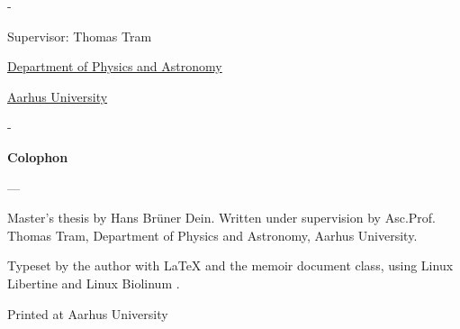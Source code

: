 \begin{titlingpage}
\begin{adjustwidth*}{\frontpagecorrection-2cm}{-\frontpagecorrection-2cm}
    \vspace{2cm}

    \fontsize{16pt}{20pt}\selectfont
    \par
    \par

    \bigskip

    \fontsize{14pt}{18pt}\selectfont
    \par
    \par

    \vfill

    Supervisor: Thomas Tram \par

    \vfill

    \fontsize{12pt}{14.5pt}\selectfont
    \href{https://www.phys.au.dk/}{Department of Physics and Astronomy}\par
    \href{https://www.au.dk/}{Aarhus University}

  \end{adjustwidth*}

  \newpage
  \begin{adjustwidth*}{\frontpagecorrection}{-\frontpagecorrection}
    \thispagestyle{empty}
    \strut\vfill
    {
      \setlength{\parindent}{0pt}
      \addtolength{\parskip}{.6em}

      \begin{center}
        \bfseries\sffamily Colophon
      \end{center}

      \small

      \textsl{\projecttitle}

      {--- \textsl{\projecttitledanish}}

      \smallskip

      Master's thesis by Hans Br{\"u}ner Dein. Written under supervision by Asc.Prof. Thomas Tram,
      Department of Physics and Astronomy, Aarhus University.

      Typeset by the author with \LaTeX{} and the \textsf{memoir} document class,
      using Linux Libertine and Linux Biolinum {\fontandleading}.

      Printed at Aarhus University
    }
  \end{adjustwidth*}
\end{titlingpage}


